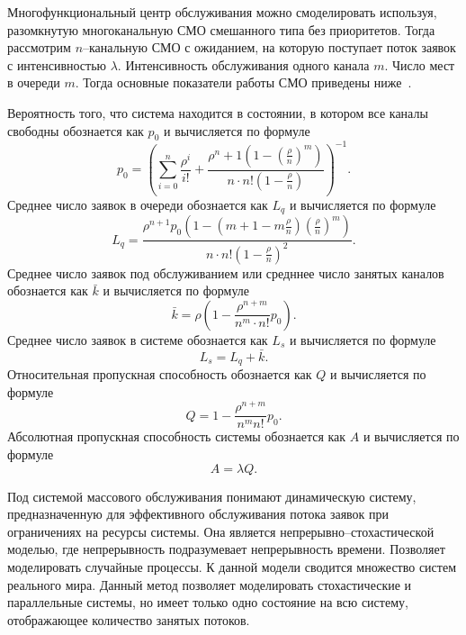 Многофункциональный центр обслуживания можно смоделировать используя, разомкнутую многоканальную СМО смешанного типа без приоритетов. Тогда рассмотрим $n$--канальную СМО с ожиданием, на которую поступает поток заявок с интенсивностью $\lambda$. Интенсивность обслуживания одного канала $m$. Число мест в очереди $m$. Тогда основные показатели работы СМО приведены ниже~\cite{smo}.

Вероятность того, что система находится в состоянии, в котором все каналы свободны обознается как $p_0$ и вычисляется по формуле
\begin{equation}
	\label{eq:smo_po}
	p_0 = (\sum_{i=0}^{n}\frac{\rho^i}{i!} + \frac{\rho^n+1(1-(\frac{\rho}{n})^m)}{n \cdot n! (1 - \frac{\rho}{n})})^{-1}.
\end{equation}
Среднее число заявок в очереди обознается как $L_q$ и вычисляется по формуле
\begin{equation}
	\label{eq:smo_lq}
	L_q=\frac{\rho^{n+1} p_0\left(1-\left(m+1-m \frac{\rho}{n}\right)\left(\frac{\rho}{n}\right)^m\right)}{n \cdot n !\left(1-\frac{\rho}{n}\right)^2}.
\end{equation}
Среднее число заявок под обслуживанием или средннее число занятых каналов обознается как $\bar{k}$ и вычисляется по формуле
\begin{equation}
	\label{eq:smo_k}
	\bar{k}=\rho\left(1-\frac{\rho^{n+m}}{n^m \cdot n !} p_0\right).
\end{equation}
Среднее число заявок в системе обознается как $L_s$ и вычисляется по формуле
\begin{equation}
	\label{eq:smo_ls}
	L_s=L_q+\bar{k}.
\end{equation}
Относительная пропускная способность обознается как $Q$ и вычисляется по формуле
\begin{equation}
	\label{eq:smo_q}
	Q=1-\frac{\rho^{n+m}}{n^m n !} p_0.
\end{equation}
Абсолютная пропускная способность системы обознается как $A$ и вычисляется по формуле
\begin{equation}
	\label{eq:smo_a}
	A=\lambda Q.
\end{equation}

Под системой массового обслуживания понимают динамическую систему, предназначенную для эффективного обслуживания потока заявок  при ограничениях на ресурсы системы. Она является непрерывно--стохастической моделью, где непрерывность подразумевает непрерывность времени. Позволяет моделировать случайные процессы. К данной модели сводится множество систем реального мира. Данный метод позволяет моделировать стохастические и параллельные системы, но имеет только одно состояние на всю систему, отображающее количество занятых потоков.

